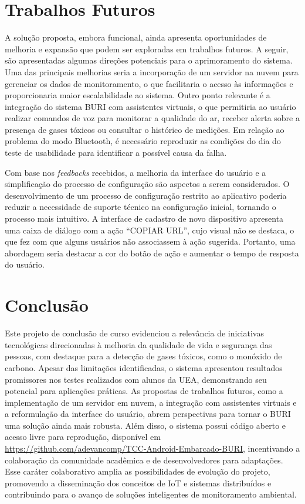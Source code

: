 \section{Trabalhos Futuros}\label{cap5:trabalhos-futuros}

A solução proposta, embora funcional, ainda apresenta oportunidades de melhoria e expansão que podem ser exploradas em trabalhos futuros. A seguir, são apresentadas algumas direções potenciais para o aprimoramento do sistema. Uma das 
principais melhorias seria a incorporação de um servidor na nuvem para gerenciar os dados de monitoramento, o que facilitaria o acesso às informações e proporcionaria maior escalabilidade ao sistema. Outro ponto relevante é a integração do sistema 
BURI com assistentes virtuais, o que permitiria ao usuário realizar comandos de voz para monitorar a qualidade do ar, receber alerta sobre a presença de gases tóxicos ou consultar o histórico de medições. Em relação ao problema do modo 
Bluetooth, é necessário reproduzir as condições do dia do teste de usabilidade para identificar a possível causa da falha.

Com base nos \textit{feedbacks} recebidos, a melhoria da interface do usuário e a simplificação do processo de configuração são aspectos a serem considerados. O desenvolvimento de um processo de configuração restrito ao aplicativo poderia reduzir a 
necessidade de suporte técnico na configuração inicial, tornando o processo mais intuitivo. A interface de cadastro de novo dispositivo apresenta uma caixa de diálogo com a ação ``COPIAR URL'', cujo visual não se destaca, o que fez com que alguns 
usuários não associassem à ação sugerida. Portanto, uma abordagem seria destacar a cor do botão de ação e aumentar o tempo 
de resposta do usuário.

\section{Conclusão}\label{cap5:conclusao}

Este projeto de conclusão de curso evidenciou a relevância de iniciativas tecnológicas direcionadas à melhoria da qualidade de vida e segurança das pessoas, com destaque para 
a detecção de gases tóxicos, como o monóxido de carbono. Apesar das limitações identificadas, o sistema apresentou resultados promissores nos testes realizados com 
alunos da UEA, demonstrando seu potencial para aplicações práticas. As propostas de trabalhos futuros, como a implementação de um servidor em nuvem, a integração com assistentes 
virtuais e a reformulação da interface do usuário, abrem perspectivas para tornar o BURI uma solução ainda mais robusta. Além disso, o sistema possui código aberto e acesso livre 
para reprodução, disponível em \url{https://github.com/adevancomp/TCC-Android-Embarcado-BURI}, incentivando a colaboração da comunidade acadêmica e de desenvolvedores para adaptações. Esse caráter colaborativo amplia as possibilidades de evolução do projeto, 
promovendo a disseminação dos conceitos de IoT e sistemas distribuídos e contribuindo para o avanço de soluções inteligentes de monitoramento ambiental.
